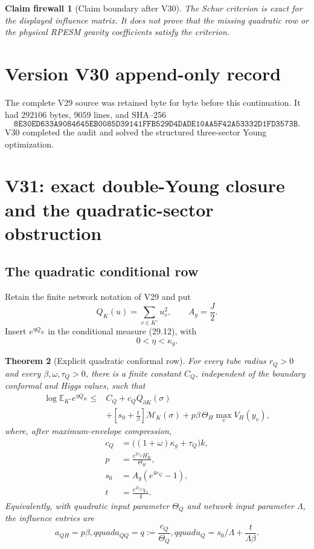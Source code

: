 \documentclass[11pt]{article}
\newtheorem{theorem}{Theorem}[section]
\newtheorem{firewall}[theorem]{Claim firewall}
\theoremstyle{remark}
\begin{document}
\begin{firewall}[Claim boundary after V30]
\label{fire:v17v30}
The Schur criterion is exact for the displayed influence matrix.  It
does not prove that the missing quadratic row or the physical RPESM
gravity coefficients satisfy the criterion.
\end{firewall}

\section*{Version V30 append-only record}
The complete V29 source was retained byte for byte before this
continuation.  It had \(292106\) bytes, \(9059\) lines, and SHA--256
\[
 \texttt{8E30ED633A9084645EB0085D39141FFB529D4DADE10AA5F42A53332D1FD3573B}.
\]
V30 completed the audit and solved the structured three-sector Young
optimization.


\section{V31: exact double-Young closure and the quadratic-sector obstruction}
\label{sec:v17v31}

\subsection{The quadratic conditional row}

Retain the finite network notation of V29 and put
\[
 Q_K(u)=\sum_{v\in K^\circ}u_v^2,
 \qquad A_g=\frac J2.                              \tag{31.1}
\]
Insert \(e^{\eta Q_K}\) in the conditional measure (29.12), with
\[
 0<\eta<\kappa_g.                                  \tag{31.2}
\]

\begin{theorem}[Explicit quadratic conformal row]
\label{thm:v17v31-qrow}
For every tube radius \(r_Q>0\) and every
\(\beta,\omega,\tau_Q>0\), there is a finite constant \(C_Q\),
independent of the boundary conformal and Higgs values, such that
\[
\begin{aligned}
 \log\mathbb E_{K^\circ}e^{\eta Q_K}
 \leq{}&C_Q+c_QQ_{\partial K}(\sigma)\\
 &+\left[s_0+\frac{t}{\beta}\right]
 \mathcal M_K(\sigma)
 +p\beta\,\Theta_H\max_vV_H(y_v),                 \tag{31.3}
\end{aligned}
\]
where, after maximum-envelope compression,
\[
\begin{aligned}
 c_Q&=\bigl((1+\omega)\kappa_g+\tau_Q\bigr)k,\\
 p&=\frac{e^{2r_Q}H_K^\circ}{\Theta_H},\\
 s_0&=A_g(e^{4r_Q}-1),\\
 t&=\frac{e^{2r_Q}\chi_*}{4}.                     \tag{31.4}
\end{aligned}
\]
Equivalently, with quadratic input parameter \(\Theta_Q\) and network
input parameter \(\Lambda\), the influence entries are
\[
 a_{QH}=p\beta,qquad
 a_{QQ}=q:=\frac{c_Q}{\Theta_Q},qquad
 u_Q=s_0/\Lambda+\frac{t}{\Lambda\beta}.           \tag{31.5}
\]
\end{theorem}
\end{document}
